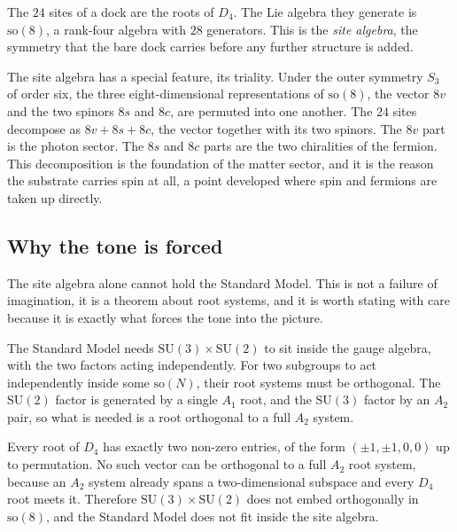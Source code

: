 \begin{definition}
The $24$ sites of a dock are the roots of $D_4$. The Lie algebra they generate is $\mathrm{so}(8)$, a rank-four algebra with $28$ generators. This is the \emph{site algebra}, the symmetry that the bare dock carries before any further structure is added.
\end{definition}

The site algebra has a special feature, its triality. Under the outer symmetry $S_3$ of order six, the three eight-dimensional representations of $\mathrm{so}(8)$, the vector $8v$ and the two spinors $8s$ and $8c$, are permuted into one another. The $24$ sites decompose as $8v + 8s + 8c$, the vector together with its two spinors. The $8v$ part is the photon sector. The $8s$ and $8c$ parts are the two chiralities of the fermion. This decomposition is the foundation of the matter sector, and it is the reason the substrate carries spin at all, a point developed where spin and fermions are taken up directly.

\subsection{Why the tone is forced}

The site algebra alone cannot hold the Standard Model. This is not a failure of imagination, it is a theorem about root systems, and it is worth stating with care because it is exactly what forces the tone into the picture.

The Standard Model needs $\mathrm{SU}(3) \times \mathrm{SU}(2)$ to sit inside the gauge algebra, with the two factors acting independently. For two subgroups to act independently inside some $\mathrm{so}(N)$, their root systems must be orthogonal. The $\mathrm{SU}(2)$ factor is generated by a single $A_1$ root, and the $\mathrm{SU}(3)$ factor by an $A_2$ pair, so what is needed is a root orthogonal to a full $A_2$ system.

\begin{lemma}
Every root of $D_4$ has exactly two non-zero entries, of the form $(\pm 1, \pm 1, 0, 0)$ up to permutation. No such vector can be orthogonal to a full $A_2$ root system, because an $A_2$ system already spans a two-dimensional subspace and every $D_4$ root meets it. Therefore $\mathrm{SU}(3) \times \mathrm{SU}(2)$ does not embed orthogonally in $\mathrm{so}(8)$, and the Standard Model does not fit inside the site algebra.
\end{lemma}

